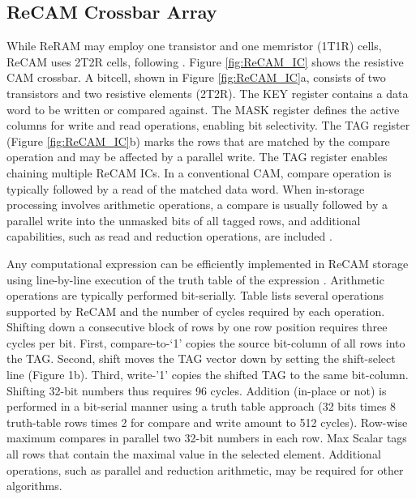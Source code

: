 \documentclass{superfri}
\begin{document}
\subsection{ReCAM Crossbar Array}
\label{sec:ReCAM_crossbar}
While ReRAM may employ one transistor and one memristor (1T1R) cells, ReCAM uses 2T2R cells, following \cite{akinaga2010resistive}\cite{azarkhish2017logic}. Figure \ref{fig:ReCAM_IC} shows the resistive CAM crossbar. A bitcell, shown in Figure \ref{fig:ReCAM_IC}a, consists of two transistors and two resistive elements (2T2R). The KEY register contains a data word to be written or compared against. The MASK register defines the active columns for write and read operations, enabling bit selectivity. The TAG register (Figure \ref{fig:ReCAM_IC}b) marks the rows that are matched by the compare operation and may be affected by a parallel write. The TAG register enables chaining multiple ReCAM ICs.
In a conventional CAM, compare operation is typically followed by a read of the matched data word. When in-storage processing involves arithmetic operations, a compare is usually followed by a parallel write into the unmasked bits of all tagged rows, and additional capabilities, such as read and reduction operations, are included \cite{yavits2015resistive}. 


Any computational expression can be efficiently implemented in ReCAM storage using line-by-line execution of the truth table of the expression \cite{balasubramonian2014near}. Arithmetic operations are typically performed bit-serially. Table  lists several operations supported by ReCAM and the number of cycles required by each operation.  Shifting down a consecutive block of rows by one row position requires three cycles per bit. First, compare-to-‘1' copies the source bit-column of all rows into the TAG. Second, shift moves the TAG vector down by setting the shift-select line (Figure 1b). Third, write-'1' copies the shifted TAG to the same bit-column. Shifting 32-bit numbers thus requires 96 cycles. Addition (in-place or not) is performed in a bit-serial manner using a truth table approach \cite{balasubramonian2014near} (32 bits times 8 truth-table rows times 2 for compare and write amount to 512 cycles). Row-wise maximum compares in parallel two 32-bit numbers in each row. Max Scalar tags all rows that contain the maximal value in the selected element. Additional operations, such as parallel and reduction arithmetic, may be required for other algorithms. 
\end{document}
